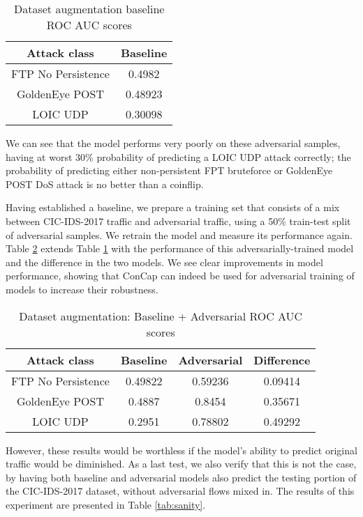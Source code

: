 \begin{table}
	\caption{Dataset augmentation baseline ROC AUC scores}
	\centering
	\begin{tabular}{|c|c|}
		\hline
		Attack class & Baseline \\
		\hline
		FTP No Persistence & 0.4982 \\
		GoldenEye POST & 0.48923\\
		LOIC UDP & 0.30098\\
		\hline
	\end{tabular}
	\label{tab:baseline}
\end{table}

We can see that the model performs very poorly on these adversarial samples, having at worst 30\% probability of predicting a LOIC UDP attack correctly; the probability of predicting either non-persistent FPT bruteforce or GoldenEye POST DoS attack is no better than a coinflip. 

Having established a baseline, we prepare a training set that consists of a mix between CIC-IDS-2017 traffic and adversarial traffic, using a 50\% train-test split of adversarial samples. We retrain the model and measure its performance again. Table \ref{tab:adversarial} extends Table \ref{tab:baseline} with the performance of this adversarially-trained model and the difference in the two models. We see clear improvements in model performance, showing that ConCap can indeed be used for adversarial training of models to increase their robustness.

\begin{table}
	\caption{Dataset augmentation: Baseline + Adversarial ROC AUC scores}
	\centering
	\begin{tabular}{|c|c|c|c|}
		\hline
		Attack class & Baseline & Adversarial & Difference\\
		\hline
		FTP No Persistence & 0.49822 & 0.59236 & 0.09414\\
		GoldenEye POST & 0.4887 & 0.8454 & 0.35671\\
		LOIC UDP & 0.2951 & 0.78802 & 0.49292\\
		\hline
	\end{tabular}
	\label{tab:adversarial}
\end{table}

However, these results would be worthless if the model's ability to predict original traffic would be diminished. As a last test, we also verify that this is not the case, by having both baseline and adversarial models also predict the testing portion of the CIC-IDS-2017 dataset, without adversarial flows mixed in. The results of this experiment are presented in Table \ref{tab:sanity}.

